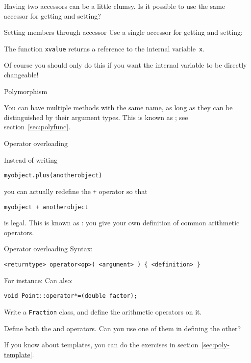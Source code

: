 Having two accessors can be a little clumsy. Is it possible to use the
same accessor for getting and setting?

\begin{block}{Setting members through accessor}
  \label{sl:setmember}
  Use a single accessor for getting and setting:

  The function \lstinline{xvalue} returns a reference to the internal
  variable~\lstinline{x}.
\end{block}

Of course you should only do this if you want the internal variable to
be directly changeable!

 {Polymorphism}

You can have multiple methods with the same name, as long as they can
be distinguished by their argument types. This is known as ;
see section~\ref{sec:polyfunc}.

 {Operator overloading}
\label{sec:operatordef}

Instead of writing 
\begin{lstlisting}
myobject.plus(anotherobject)
\end{lstlisting}
you can actually redefine the \lstinline{+} operator so that
\begin{lstlisting}
myobject + anotherobject
\end{lstlisting}
is legal. This is known as :
you give your own definition of common arithmetic operators.

\begin{block}{Operator overloading}
  \label{sl:object-operator}
  Syntax:
\begin{lstlisting}
<returntype> operator<op>( <argument> ) { <definition> }
\end{lstlisting}
For instance:
%
%
Can also:
\begin{lstlisting}
void Point::operator*=(double factor);
\end{lstlisting}
\end{block}

\begin{exercise}
  Write a \lstinline{Fraction} class, and define the arithmetic operators on it.

  Define both the \n{+} and \n{+=} operators. Can you use one of them
  in defining the other?
\end{exercise}
\begin{exercise}
  If you know about templates, you can do the exercises in section~\ref{sec:poly-template}.
\end{exercise}

